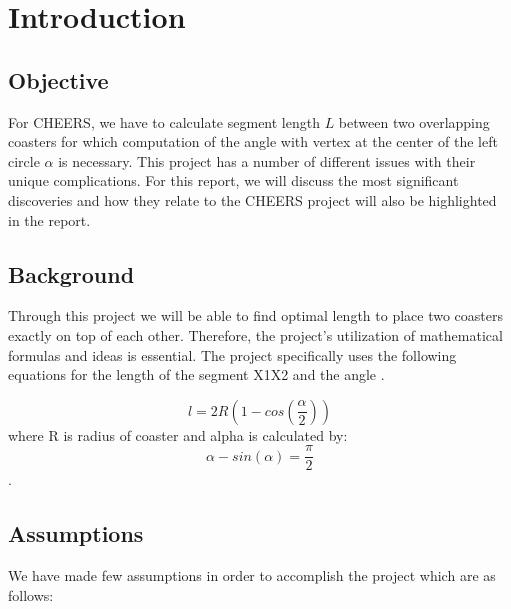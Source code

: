 \chapter{Introduction}

\section{Objective}
For CHEERS, we have to calculate segment length \textbf{$L$} between two overlapping coasters for which computation of  the angle with vertex at the
center of the left circle \textbf{$\alpha$} is necessary. This project has a number of different issues with their unique complications.
 For this report, we will discuss  the most significant discoveries and how they relate to the CHEERS project will also be highlighted in the report.

\section{Background}
Through this project we will be able to find optimal length to place two coasters exactly on top of each other. Therefore, the project's utilization of mathematical formulas and ideas is essential. The project specifically uses the following equations for the length of the segment 
X1X2 and the angle .

$$l = 2R(1 - cos(\frac{\alpha}{2}))$$ 
where R is radius of coaster
and alpha is calculated by:
$$\alpha - sin(\alpha) = \frac{\pi}{2}$$.

\section{Assumptions}
We have made few assumptions in order to accomplish the project which are as follows:

